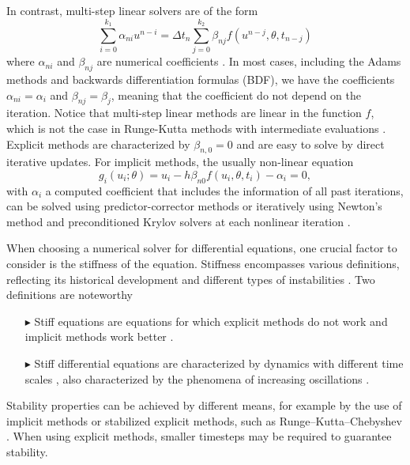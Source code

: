 In contrast, multi-step linear solvers are of the form 
\begin{equation}
    \sum_{i=0}^{k_1} \alpha_{ni} u^{n-i} 
    =
    \Delta t_n \sum_{j=0}^{k_2} \beta_{nj} f(u^{n-j}, \theta, t_{n-j})
\end{equation}
where $\alpha_{ni}$ and $\beta_{nj}$ are numerical coefficients \cite{hairer-solving-1}.
In most cases, including the Adams methods and backwards differentiation formulas (BDF), we have the coefficients $\alpha_{ni} = \alpha_i$ and $\beta_{nj}=\beta_j$, meaning that the coefficient do not depend on the iteration. 
Notice that multi-step linear methods are linear in the function $f$, which is not the case in Runge-Kutta methods with intermediate evaluations \cite{ascher2008numerical}.
Explicit methods are characterized by $\beta_{n, 0} = 0$ and are easy to solve by direct iterative updates. 
For implicit methods, the usually non-linear equation 
\begin{equation}
    g_i(u_i; \theta) = u_i - h \beta_{n0} f(u_i, \theta, t_i) - \alpha_i = 0,
    \label{eq:solver-constriant-example}
\end{equation}
with $\alpha_i$ a computed coefficient that includes the information of all past iterations, can be solved using predictor-corrector methods \cite{hairer-solving-1} or iteratively using Newton's method and preconditioned Krylov solvers at each nonlinear iteration \cite{SUNDIALS-hindmarsh2005sundials}.  

When choosing a numerical solver for differential equations, one crucial factor to consider is the stiffness of the equation.
Stiffness encompasses various definitions, reflecting its historical development and different types of instabilities \cite{Dahlquist_1985}.
Two definitions are noteworthy
\begin{enumerate}
    \item[$ \blacktriangleright$] Stiff equations are equations for which explicit methods do not work and implicit methods work better \cite{hairer-solving-2}.
    \item[$ \blacktriangleright$] Stiff differential equations are characterized by dynamics with different time scales \cite{hairer-solving-2, kim_stiff_2021}, also characterized by the phenomena of increasing oscillations \cite{Dahlquist_1985}.
\end{enumerate} 
Stability properties can be achieved by different means, for example by the use of implicit methods or stabilized explicit methods, such as Runge–Kutta–Chebyshev \cite{van1980internal, hairer-solving-2}. 
When using explicit methods, smaller timesteps may be required to guarantee stability. 

